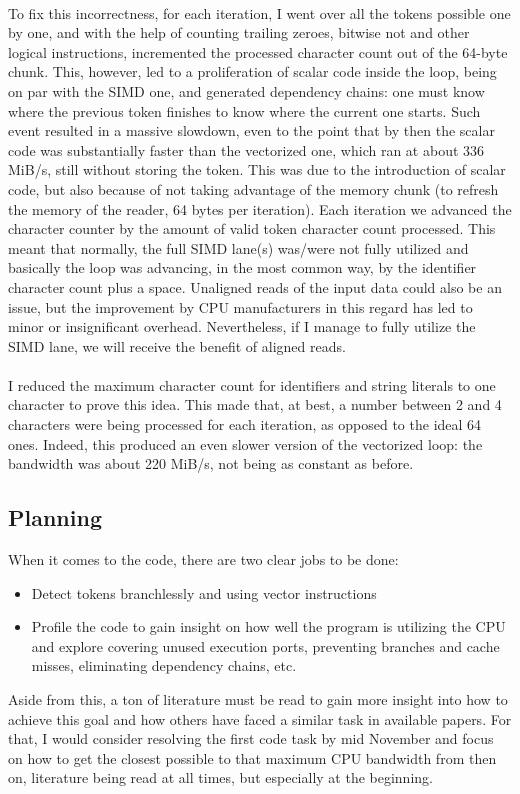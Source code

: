 \documentclass[12pt]{article}
\begin{document}
	\paragraph{}
	To fix this incorrectness, for each iteration, I went over all the tokens possible one by one, and with the help of counting trailing zeroes, bitwise not and other logical instructions, incremented the processed character count out of the 64-byte chunk. This, however, led to a proliferation of scalar code inside the loop, being on par with the SIMD one, and generated dependency chains: one must know where the previous token finishes to know where the current one starts. Such event resulted in a massive slowdown, even to the point that by then the scalar code was substantially faster than the vectorized one, which ran at about 336 MiB/s, still without storing the token. This was due to the introduction of scalar code, but also because of not taking advantage of the memory chunk (to refresh the memory of the reader, 64 bytes per iteration). Each iteration we advanced the character counter by the amount of valid token character count processed. This meant that normally, the full SIMD lane(s) was/were not fully utilized and basically the loop was advancing, in the most common way, by the identifier character count plus a space. Unaligned reads of the input data could also be an issue, but the improvement by CPU manufacturers in this regard has led to minor or insignificant overhead. Nevertheless, if I manage to fully utilize the SIMD lane, we will receive the benefit of aligned reads.
	
	\paragraph{}
	I reduced the maximum character count for identifiers and string literals to one character to prove this idea. This made that, at best, a number between 2 and 4 characters were being processed for each iteration, as opposed to the ideal 64 ones. Indeed, this produced an even slower version of the vectorized loop: the bandwidth was about 220 MiB/s, not being as constant as before.
	
	\subsection{Planning}
	When it comes to the code, there are two clear jobs to be done:
	\begin{itemize}
		\item Detect tokens branchlessly and using vector instructions
		\item Profile the code to gain insight on how well the program is utilizing the CPU and explore covering unused execution ports, preventing branches and cache misses, eliminating dependency chains, etc.
	\end{itemize}
	Aside from this, a ton of literature must be read to gain more insight into how to achieve this goal and how others have faced a similar task in available papers.
	For that, I would consider resolving the first code task by mid November and focus on how to get the closest possible to that maximum CPU bandwidth from then on, literature being read at all times, but especially at the beginning.
\end{document}
